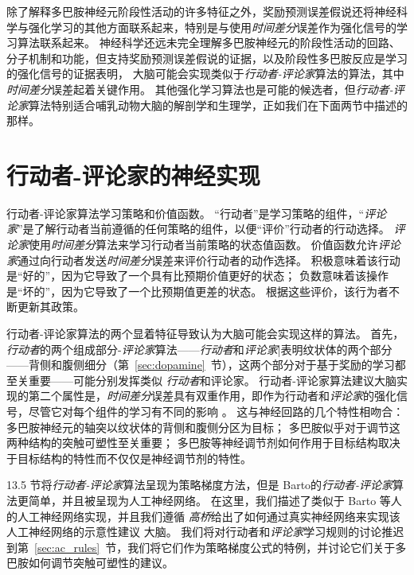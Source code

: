 除了解释多巴胺神经元阶段性活动的许多特征之外，奖励预测误差假说还将神经科学与强化学习的其他方面联系起来，特别是与使用\textit{时间差分}误差作为强化信号的学习算法联系起来。
神经科学还远未完全理解多巴胺神经元的阶段性活动的回路、分子机制和功能，但支持奖励预测误差假说的证据，以及阶段性多巴胺反应是学习的强化信号的证据表明， 大脑可能会实现类似于\textit{行动者-评论家}算法的算法，其中\textit{时间差分}误差起着关键作用。
其他强化学习算法也是可能的候选者，但\textit{行动者-评论家}算法特别适合哺乳动物大脑的解剖学和生理学，正如我们在下面两节中描述的那样。



\section{行动者-评论家的神经实现} \label{sec:neural_ac}

行动者-评论家算法学习策略和价值函数。
“行动者”是学习策略的组件，“\textit{评论家}”是了解行动者当前遵循的任何策略的组件，以便“评价”行动者的行动选择。
\textit{评论家}使用\textit{时间差分}算法来学习行动者当前策略的状态值函数。
价值函数允许\textit{评论家}通过向行动者发送\textit{时间差分}误差来评价行动者的动作选择。
积极意味着该行动是“好的”，因为它导致了一个具有比预期价值更好的状态；
负数意味着该操作是“坏的”，因为它导致了一个比预期值更差的状态。
根据这些评价，该行为者不断更新其政策。


行动者-评论家算法的两个显着特征导致认为大脑可能会实现这样的算法。
首先，\textit{行动者}的两个组成部分-\textit{评论家}算法——\textit{行动者}和\textit{评论家}|表明纹状体的两个部分——背侧和腹侧细分（第~\ref{sec:dopamine}~节），这两个部分对于基于奖励的学习都至关重要——可能分别发挥类似 \textit{行动者}和评论家。
行动者-评论家算法建议大脑实现的第二个属性是，\textit{时间差分}误差具有双重作用，即作为行动者和\textit{评论家}的强化信号，尽管它对每个组件的学习有不同的影响 。
这与神经回路的几个特性相吻合：多巴胺神经元的轴突以纹状体的背侧和腹侧分区为目标；
多巴胺似乎对于调节这两种结构的突触可塑性至关重要；
多巴胺等神经调节剂如何作用于目标结构取决于目标结构的特性而不仅仅是神经调节剂的特性。


13.5 节将\textit{行动者-评论家}算法呈现为策略梯度方法，但是 Barto\cite{barto13neuron}的\textit{行动者-评论家}算法更简单，并且被呈现为人工神经网络。
在这里，我们描述了类似于 Barto 等人的人工神经网络实现，并且我们遵循 \textit{高桥}\cite{takahashi2008silencing}给出了如何通过真实神经网络来实现该人工神经网络的示意性建议 大脑。
我们将对行动者和\textit{评论家}学习规则的讨论推迟到第~\ref{sec:ac_rules}~节，我们将它们作为策略梯度公式的特例，并讨论它们关于多巴胺如何调节突触可塑性的建议。


